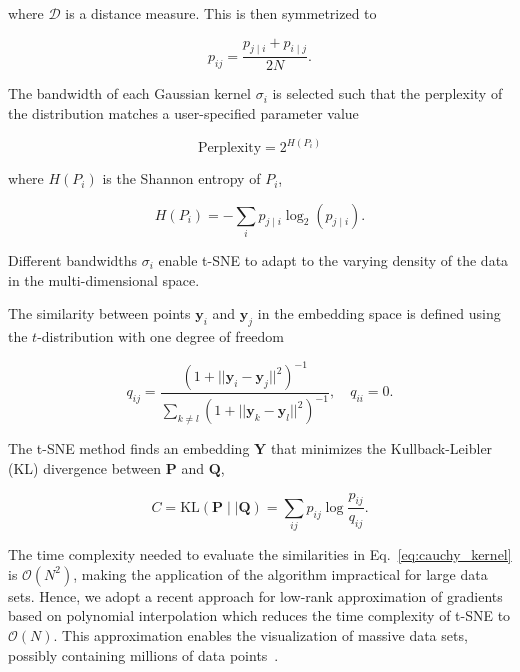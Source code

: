 \documentclass[runningheads]{llncs}
\begin{document}
\noindent where $\mathcal{D}$ is a distance measure. This is then symmetrized to

\begin{equation}
p_{ij} = \frac{p_{j \mid i} + p_{i \mid j}}{2N}.
\label{eq:symmetrize}
\end{equation}

The bandwidth of each Gaussian kernel $\sigma_i$ is selected such that the
perplexity of the distribution matches a user-specified parameter value

\begin{equation}
\text{Perplexity} = 2^{H(P_i)}
\end{equation}

\noindent where $H(P_i)$ is the Shannon entropy of $P_i$,

\begin{equation}
H(P_i) = -\sum_i p_{j \mid i} \log_2 (p_{j \mid i}).
\end{equation}

\noindent Different bandwidths $\sigma_i$ enable t-SNE to adapt to the varying
density of the data in the multi-dimensional space.

The similarity between points $\mathbf{y}_i$ and $\mathbf{y}_j$ in the
embedding space is defined using the $t$-distribution with one degree of
freedom

\begin{equation}
q_{ij} = \frac{\left ( 1 + || \mathbf{y}_i - \mathbf{y}_j ||^2 \right )^{-1}}
{\sum_{k \neq l}\left ( 1 + || \mathbf{y}_k - \mathbf{y}_l ||^2 \right )^{-1}},
\quad q_{ii} = 0.
\label{eq:cauchy_kernel}
\end{equation}

The t-SNE method finds an embedding $\mathbf{Y}$ that minimizes
the Kullback-Leibler (KL) divergence between $\mathbf{P}$ and $\mathbf{Q}$,

\begin{equation}
C = \text{KL}(\mathbf{P} \mid \mid \mathbf{Q}) = \sum_{ij} p_{ij} \log \frac{p_{ij}}{q_{ij}}.
\label{eq:kl_divergence}
\end{equation}

The time complexity needed to evaluate the similarities in
Eq.~\ref{eq:cauchy_kernel} is $\mathcal{O}(N^2)$, making the application of
the algorithm impractical for large data sets. 
Hence, we adopt a recent approach for low-rank approximation of
gradients based on polynomial interpolation which reduces the time
complexity of t-SNE to $\mathcal{O}(N)$. This approximation enables the
visualization of massive data sets, possibly containing millions of data
points~\cite{fi_tsne}.
\end{document}
